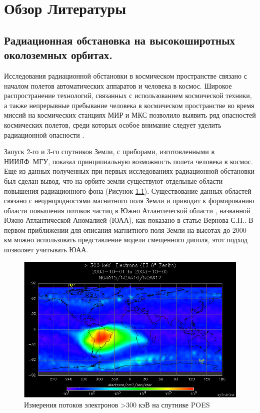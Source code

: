 \chapter{Обзор Литературы} \label{chapt1}

\section{Радиационная обстановка на высокоширотных околоземных орбитах. } \label{sect1_1}

Исследования радиационной обстановки в космическом пространстве связано с началом полетов автоматических аппаратов и человека в космос.  Широкое распространение технологий, связанных с использованием космической техники, а также непрерывные пребывание человека в космическом пространстве во время миссий на космических станциях МИР и МКС позволило выявить ряд опасностей космических полетов, среди которых особое внимание следует уделить радиационной опасности \cite{logachev2007}.


Запуск 2-го и 3-го спутников Земли, с приборами, изготовленными в НИИЯФ~МГУ,  
показал принципиальную возможность полета человека в космос.  Еще из данных полученных при первых исследованиях радиационной 
обстановки был сделан вывод, что на орбите земли существуют отдельные области повышения радиационного фона (Рисунок \ref{fig:cylindricalpoes200310mep}). Существование данных областей связано с неоднородностями 
магнитного поля Земли и приводит к формированию области повышения потоков 
частиц в 
Южно Атлантической области \cite{logachev2007}, названной Южно-Атлантической 
Аномалией (ЮАА), как показано в статье Вернова С.Н.\cite{vernov1961}. В первом 
приближении для описания магнитного поля  Земли на высотах до 2000 км можно 
использовать представление модели смещенного диполя, этот подход позволяет 
учитывать ЮАА.

\begin{figure}
	\centering
	\includegraphics[width=0.7\linewidth]{images/cylindrical_poes_200310_mep}
	\caption{Измерения потоков электронов >300 кэВ на спутнике POES \cite{Peck2008}}
	\label{fig:cylindricalpoes200310mep}
\end{figure}

